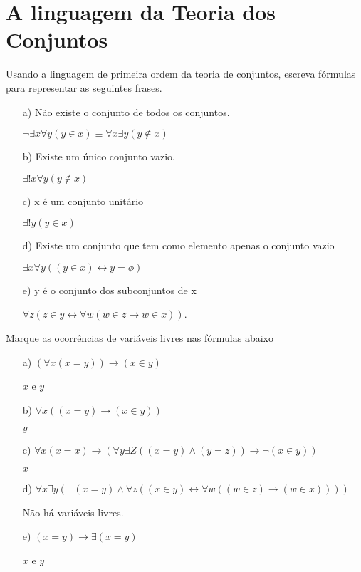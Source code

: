 \chapter{A linguagem da Teoria dos Conjuntos}

\setcounter{ex}{0}

\begin{exercicio}
	Usando a linguagem de primeira ordem da teoria de conjuntos, escreva fórmulas para representar as seguintes frases.
\end{exercicio}

\begin{solucao}
\begin{enumerate}
	\item[a)] Não existe o conjunto de todos os conjuntos.
    \item[] $\neg \exists x \forall y (y \in x) \equiv \forall x \exists y (y \notin x)$
	\item[b)] Existe um único conjunto vazio.
    \item[] $\exists ! x \forall y (y \notin x)$
	\item[c)] x é um conjunto unitário
    \item[] $\exists ! y (y \in x)$
	\item[d)] Existe um conjunto que tem como elemento apenas o conjunto vazio
    \item[] $\exists x \forall y ((y \in x) \leftrightarrow y = \phi)$
	\item[e)] y é o conjunto dos subconjuntos de x 
    \item[] $\forall z (z \in y \leftrightarrow \forall w (w \in z \to w \in x))$.
    
\end{enumerate}

\end{solucao}

\begin{exercicio}
	Marque as ocorrências de variáveis livres nas fórmulas abaixo
\end{exercicio}

\begin{enumerate}
	\item[a)] $(\forall x (x=y)) \rightarrow (x \in y ) $
    \item[] $x$ e $y$
	\item[b)] $ \forall x ((x=y) \rightarrow (x \in y))$
    \item[] $y$
	\item[c)] $\forall x(x=x) \rightarrow (\forall y \exists Z ((x=y) \land (y=z)) \rightarrow \neg(x\in y))$
    \item[] $x$
	\item[d)] $ \forall x \exists y(\neg(x=y) \land \forall z ((x \in y) \leftrightarrow \forall w ((w \in z ) \rightarrow (w \in x )))) $
    \item[] Não há variáveis livres.
	\item[e)] $(x=y)\rightarrow \exists (x=y) $
    \item[] $x$ e $y$
\end{enumerate}

